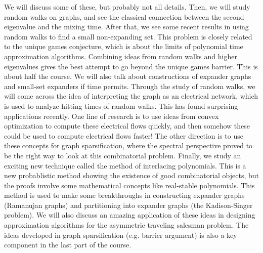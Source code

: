 \documentclass[11pt,a4paper]{report}
\begin{document}
\newline We will discuss some of these, but probably not all details.
\newline\newline Then, we will study random walks on graphs, and see the classical connection between the second eigenvalue and the mixing time.
\newline After that, we see some recent results in using random walks to find a small non-expanding set. This problem is closely related to the unique games conjecture, which is about the limits of polynomial time approximation algorithms. Combining ideas from random walks and higher eigenvalues gives the best attempt to go beyond the unique games barrier.
\newline This is about half the course. We will also talk about constructions of expander graphs and small-set expanders if time permits.
\newline\newline Through the study of random walks, we will come across the idea of interpreting the graph as an electrical network, which is used to analyze hitting times of random walks.
\newline This has found surprising applications recently.
\newline One line of research is to use ideas from convex optimization to compute these electrical flows quickly, and then somehow these could be used to compute electrical flows faster!
\newline The other direction is to use these concepts for graph sparsification, where the spectral perspective proved to be the right way to look at this combinatorial problem.
\newline\newline Finally, we study an exciting new technique called the method of interlacing polynomials. This is a new probablistic method showing the existence of good combinatorial objects, but the proofs involve some mathematical concepts like real-stable polynomials. This method is used to make some breakthroughs in constructing expander graphs (Ramanujan graphs) and partitioning into expander graphs (the Kadison-Singer problem).
\newline We will also discuss an amazing application of these ideas in designing approximation algorithms for the asymmetric traveling salesman problem.
\newline The ideas developed in graph sparsification (e.g. barrier argument) is also a key component in the last part of the course.
\end{document}
